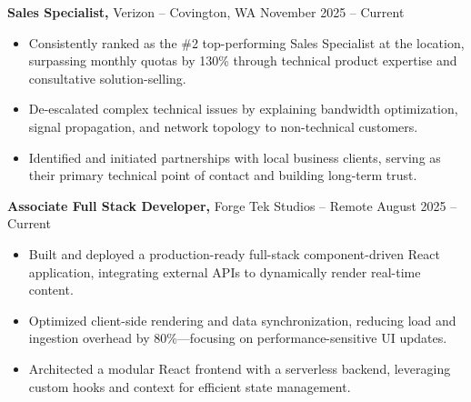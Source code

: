 \documentclass[11pt]{article}       %
\begin{document}
\textbf{Sales Specialist,} {Verizon} -- Covington, WA \hfill November 2025 -- Current \\
\vspace{-9pt}
\begin{itemize}
  \item Consistently ranked as the \#2 top-performing Sales Specialist at the location, surpassing monthly quotas by 130\% through technical product expertise and consultative solution-selling.
  \item De-escalated complex technical issues by explaining bandwidth optimization, signal propagation, and network topology to non-technical customers.
  \item Identified and initiated partnerships with local business clients, serving as their primary technical point of contact and building long-term trust.
\end{itemize}

\textbf{Associate Full Stack Developer,} {Forge Tek Studios} -- Remote \hfill August 2025 -- Current 
\vspace{-9pt}
\begin{itemize}
  \item Built and deployed a production-ready full-stack component-driven React application, integrating external APIs to dynamically render real-time content.
  \item Optimized client-side rendering and data synchronization, reducing load and ingestion overhead by 80\%—focusing on performance-sensitive UI updates.
  \item Architected a modular React frontend with a serverless backend, leveraging custom hooks and context for efficient state management.
\end{itemize}

\end{document}
